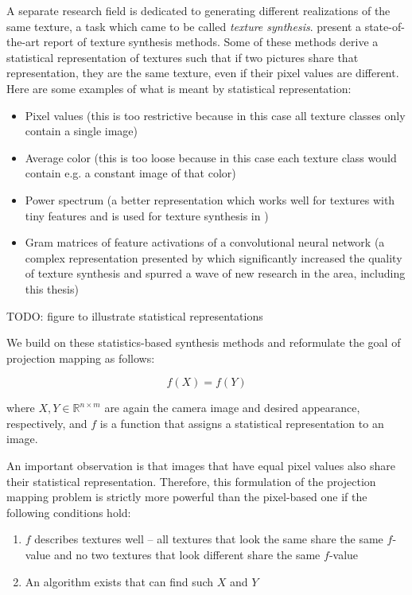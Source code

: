 A separate research field is dedicated to generating different realizations of the same texture, a task which came to be called \textit{texture synthesis}. \citet*{Raad2018} present a state-of-the-art report of texture synthesis methods. Some of these methods derive a statistical representation of textures such that if two pictures share that representation, they are the same texture, even if their pixel values are different. Here are some examples of what is meant by statistical representation:

\begin{itemize}
    \item Pixel values (this is too restrictive because in this case all texture classes only contain a single image)
    \item Average color (this is too loose because in this case each texture class would contain e.g. a constant image of that color)
    \item Power spectrum (a better representation which works well for textures with tiny features and is used for texture synthesis in \citet*{Galerne2011})
    \item Gram matrices of feature activations of a convolutional neural network (a complex representation presented by \citet*{Gatys2015} which significantly increased the quality of texture synthesis and spurred a wave of new research in the area, including this thesis)
\end{itemize}

{\color{red} TODO: figure to illustrate statistical representations}

We build on these statistics-based synthesis methods and reformulate the goal of projection mapping as follows:

\[
    f(X) = f(Y)
\]

where \(X,Y \in \mathbb{R}^{n \times m}\) are again the camera image and desired appearance, respectively, and \(f\) is a function that assigns a statistical representation to an image.

An important observation is that images that have equal pixel values also share their statistical representation. Therefore, this formulation of the projection mapping problem is strictly more powerful than the pixel-based one if the following conditions hold:

\begin{enumerate}
    \item \(f\) describes textures well -- all textures that look the same share the same \(f\)-value and no two textures that look different share the same \(f\)-value
    \item An algorithm exists that can find such \(X\) and \(Y\)
\end{enumerate}

